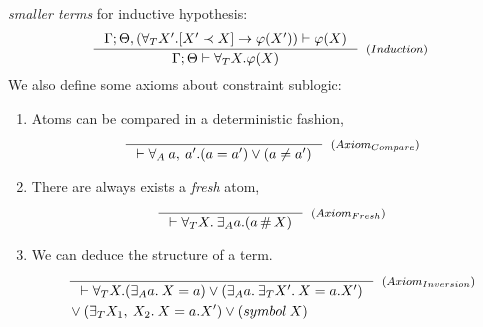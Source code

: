 \documentclass[english, mgr]{iithesis}
\begin{document}
\textit{smaller terms} for inductive hypothesis:
\begin{eqnarray*}
  \inference{
    \jgmnt[\cEnv;\Theta, (\fForallTerm{\termv'} \fCImp{\termv' \cshlt \termv} \formphi(\termv'))]{\formphi(\termv)}
    }{
    \jgmnt[\cEnv;\Theta]{\fForallTerm{\termv} \formphi(\termv)}
  }[(\ensuremath{Induction})]
\end{eqnarray*}
We also define some axioms about constraint sublogic:
\begin{enumerate}
\item Atoms can be compared in a deterministic fashion,
\begin{eqnarray*}
  \inference{
    }{
    \jgmnt[]{\fForallAtom{\:\atomv,\:\atomv'} (\atomv \ceq \atomv') \vee (\atomv \cneq \atomv')}
  }[(\ensuremath{Axiom_{Compare}})]
\end{eqnarray*}
\item There are always exists a \textit{fresh} atom,
\begin{eqnarray*}
  \inference{
    }{
    \jgmnt[]{\fForallTerm{\termv} \:\fExistsAtom{\atomv} (\atomv \cfresh \termv)}
  }[(\ensuremath{Axiom_{Fresh}})]
\end{eqnarray*}
\item We can deduce the structure of a term.
\begin{eqnarray*}
  & \inference{
    }{
    \jgmnt[]{\fForallTerm{\termv} (\fExistsAtom{\atomv}\: \termv = \atomv) \vee (\fExistsAtom{\atomv}\:\fExistsTerm{\termv'}\: \termv = \tbind{\atomv}{\termv'}) }
  }[(\ensuremath{Axiom_{Inversion}})] \\
  & \ensuremath{\vee (\fExistsTerm{\termv_1,\:\termv_2}\: \termv = \tbind{\atomv}{\termv'}) \vee ({symbol}\: \termv) } \\
\end{eqnarray*}
\end{enumerate}
\end{document}
